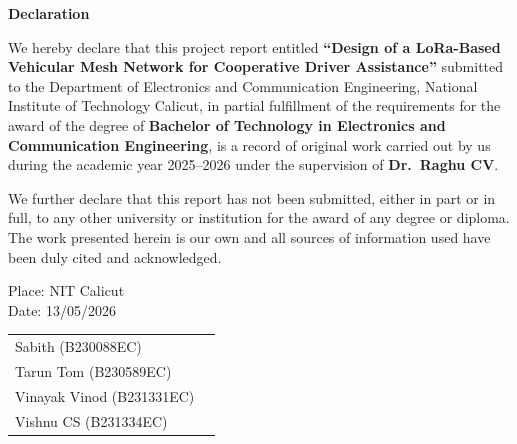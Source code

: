 \begin{center}
    \Large \textbf{Declaration}
\end{center}

\vspace{0.8cm}


\justify
We hereby declare that this project report entitled \textbf{``Design of a LoRa-Based
Vehicular Mesh Network for Cooperative Driver Assistance''} submitted to the Department of
Electronics and Communication Engineering, National Institute of Technology Calicut,
in partial fulfillment of the requirements for the award of the degree of
\textbf{Bachelor of Technology in Electronics and Communication Engineering}, is a
record of original work carried out by us during the academic year 2025--2026 under
the supervision of \textbf{Dr.\ Raghu CV}.

We further declare that this report has not been submitted, either in part or in full,
to any other university or institution for the award of any degree or diploma. The
work presented herein is our own and all sources of information used have been duly
cited and acknowledged.

\vspace{2.0cm}

\noindent Place: NIT Calicut\\
Date: 13/05/2026

\vspace{1.5cm}

\noindent
\begin{tabular}{@{}ll}
    Sabith           (B230088EC) \\[0.9cm]
    Tarun Tom        (B230589EC) \\[0.9cm]
    Vinayak Vinod    (B231331EC) \\[0.9cm]
    Vishnu CS        (B231334EC) \\
\end{tabular}